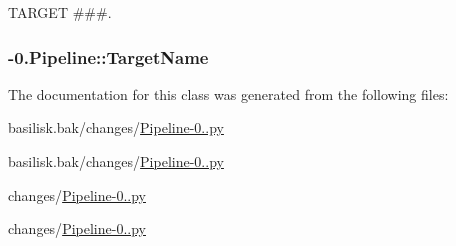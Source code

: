 \-T\-A\-R\-G\-E\-T \#\#\#. 

\hypertarget{class_pipeline-0_1_1_pipeline_a0f2274265851d6d0c0ce2ee9d281819f}{
\subsubsection[{\-Target\-Name}]{-\/0.{\bf \-Pipeline\-::\-Target\-Name}}}\label{class_pipeline-0_1_1_pipeline_a0f2274265851d6d0c0ce2ee9d281819f}


\-The documentation for this class was generated from the following files\-:\begin{DoxyCompactItemize}
\item 
basilisk.\-bak/changes/\hyperlink{basilisk_8bak_2changes_2_pipeline-0_81_8py}{\-Pipeline-\/0..\-py}\item 
basilisk.\-bak/changes/\hyperlink{basilisk_8bak_2changes_2_pipeline-0_82_8py}{\-Pipeline-\/0..\-py}\item 
changes/\hyperlink{changes_2_pipeline-0_81_8py}{\-Pipeline-\/0..\-py}\item 
changes/\hyperlink{changes_2_pipeline-0_82_8py}{\-Pipeline-\/0..\-py}\end{DoxyCompactItemize}
